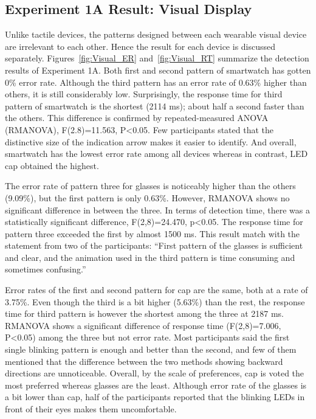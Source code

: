 \documentclass{sigchi}
\begin{document}
\subsection{Experiment 1A Result: Visual Display}
Unlike tactile devices, the patterns designed between each wearable visual device are irrelevant to each other. Hence the result for each device is discussed separately. Figures~\ref{fig:Visual_ER} and~\ref{fig:Visual_RT} summarize the detection results of Experiment 1A. Both first and second pattern of smartwatch has gotten 0\% error rate. Although the third pattern has an error rate of 0.63\% higher than others, it is still considerably low. Surprisingly, the response time for third pattern of smartwatch is the shortest (2114 ms); about half a second faster than the others. This difference is confirmed by repeated-measured ANOVA (RMANOVA), F(2.8)=11.563, P\textless0.05. Few participants stated that the distinctive size of the indication arrow makes it easier to identify. And overall, smartwatch has the lowest error rate among all devices whereas in contrast, LED cap obtained the highest.

The error rate of pattern three for glasses is noticeably higher than the others (9.09\%), but the first pattern is only 0.63\%. However, RMANOVA shows no significant difference in between the three. In terms of detection time, there was a statistically significant difference, F(2,8)=24.470, p\textless0.05. The response time for pattern three exceeded the first by almost 1500 ms. This result match with the statement from two of the participants: \textquotedblleft First pattern of the glasses is sufficient and clear, and the animation used in the third pattern is time consuming and sometimes confusing.\textquotedblright

Error rates of the first and second pattern for cap are the same, both at a rate of 3.75\%. Even though the third is a bit higher (5.63\%) than the rest, the response time for third pattern is however the shortest among the three at 2187 ms. RMANOVA shows a significant difference of response time (F(2,8)=7.006, P\textless0.05) among the three but not error rate. Most participants said the first single blinking pattern is enough and better than the second, and few of them mentioned that the difference between the two methods showing backward directions are unnoticeable. Overall, by the scale of preferences, cap is voted the most preferred whereas glasses are the least. Although error rate of the glasses is a bit lower than cap, half of the participants reported that the blinking LEDs in front of their eyes makes them uncomfortable.
\end{document}
